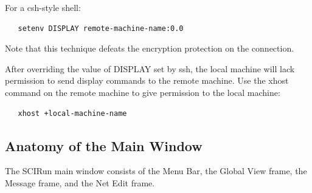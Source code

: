 \documentclass[fleqn,12pt,openany]{book}
\begin{document}
For a csh-style shell:

\begin{verbatim}
   setenv DISPLAY remote-machine-name:0.0
\end{verbatim}

Note that this technique defeats the encryption protection on the connection.

After overriding the value of DISPLAY set by ssh, the local machine will lack permission to send display commands to the remote machine.
Use the xhost command on the remote machine to give permission to the local machine:

\begin{verbatim}
   xhost +local-machine-name
\end{verbatim}

\subsection{Anatomy of the Main Window}
The SCIRun main window consists of the Menu Bar, the Global View frame, the Message frame, and the Net Edit frame.
\end{document}
